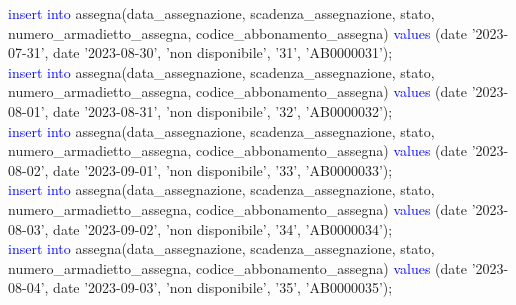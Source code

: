 \documentclass{article}
\begin{document}
\begin{flushleft}
{        \vspace{2mm}
        \hspace*{0.5em}\textcolor{blue}{insert into} assegna(data\_assegnazione, scadenza\_assegnazione, stato, \hspace*{0.5em}numero\_armadietto\_assegna, codice\_abbonamento\_assegna) \textcolor{blue}{values} \hspace*{0.5em}(date \hspace*{0.5em}'2023-07-31', date '2023-08-30', 'non disponibile', '31', 'AB0000031'); \\
        \vspace{2mm}
        \hspace*{0.5em}\textcolor{blue}{insert into} assegna(data\_assegnazione, scadenza\_assegnazione, stato, \hspace*{0.5em}numero\_armadietto\_assegna, codice\_abbonamento\_assegna) \textcolor{blue}{values} \hspace*{0.5em}(date \hspace*{0.5em}'2023-08-01', date '2023-08-31', 'non disponibile', '32', 'AB0000032'); \\
        \vspace{2mm}
        \hspace*{0.5em}\textcolor{blue}{insert into} assegna(data\_assegnazione, scadenza\_assegnazione, stato, \hspace*{0.5em}numero\_armadietto\_assegna, codice\_abbonamento\_assegna) \textcolor{blue}{values} \hspace*{0.5em}(date \hspace*{0.5em}'2023-08-02', date '2023-09-01', 'non disponibile', '33', 'AB0000033'); \\
        \vspace{2mm}
        \hspace*{0.5em}\textcolor{blue}{insert into} assegna(data\_assegnazione, scadenza\_assegnazione, stato, \hspace*{0.5em}numero\_armadietto\_assegna, codice\_abbonamento\_assegna) \textcolor{blue}{values} \hspace*{0.5em}(date \hspace*{0.5em}'2023-08-03', date '2023-09-02', 'non disponibile', '34', 'AB0000034'); \\
        \vspace{2mm}
        \hspace*{0.5em}\textcolor{blue}{insert into} assegna(data\_assegnazione, scadenza\_assegnazione, stato, \hspace*{0.5em}numero\_armadietto\_assegna, codice\_abbonamento\_assegna) \textcolor{blue}{values} \hspace*{0.5em}(date \hspace*{0.5em}'2023-08-04', date '2023-09-03', 'non disponibile', '35', 'AB0000035'); \\
}
\end{flushleft}
\end{document}
